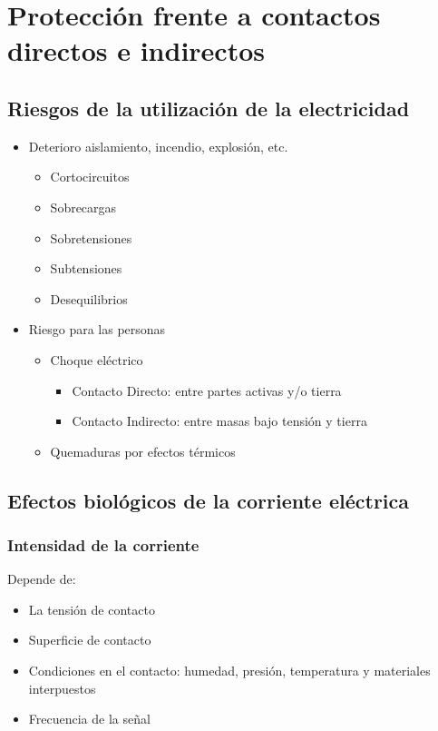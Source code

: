 \chapter{Protección frente a contactos directos e indirectos}
\section{Riesgos de la utilización de la electricidad}
\begin{itemize}
	\item Deterioro aislamiento, incendio, explosión, etc.
	\begin{itemize}
		\item Cortocircuitos
		\item Sobrecargas
		\item Sobretensiones
		\item Subtensiones
		\item Desequilibrios
	\end{itemize}
	\item Riesgo para las personas
	\begin{itemize}
		\item Choque eléctrico
		\begin{itemize}
			\item Contacto Directo: entre partes activas y/o tierra
			\item Contacto Indirecto: entre masas bajo tensión y tierra
		\end{itemize}
		\item Quemaduras por efectos térmicos
	\end{itemize}
\end{itemize}
\section{Efectos biológicos de la corriente eléctrica}
\subsection{Intensidad de la corriente}
Depende de:
\begin{itemize}
	\item La tensión de contacto
	\item Superficie de contacto
	\item Condiciones en el contacto: humedad, presión,
	temperatura y materiales interpuestos
	\item Frecuencia de la señal
\end{itemize}

